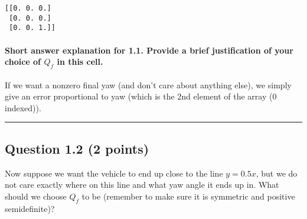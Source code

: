 \documentclass[11pt]{article}
\begin{document}
    \begin{Verbatim}[commandchars=\\\{\}]
[[0. 0. 0.]
 [0. 0. 0.]
 [0. 0. 1.]]

    \end{Verbatim}

    \paragraph{\texorpdfstring{Short answer explanation for 1.1. Provide a
brief justification of your choice of \(Q_f\) in this
cell.}{Short answer explanation for 1.1. Provide a brief justification of your choice of Q\_f in this cell.}}\label{short-answer-explanation-for-1.1.-provide-a-brief-justification-of-your-choice-of-q_f-in-this-cell.}

If we want a nonzero final yaw (and don't care about anything else), we
simply give an error proportional to yaw (which is the 2nd element of
the array (0 indexed)).

    \begin{center}\rule{0.5\linewidth}{\linethickness}\end{center}

\subsection{Question 1.2 (2 points)}\label{question-1.2-2-points}

Now suppose we want the vehicle to end up close to the line
\(y = 0.5x\), but we do not care exactly where on this line and what yaw
angle it ends up in. What should we choose \(Q_f\) to be (remember to
make sure it is symmetric and positive semidefinite)?
\end{document}
